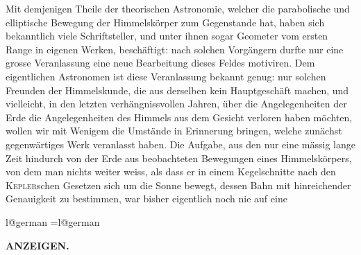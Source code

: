 Mit demjenigen Theile der theorischen Astronomie, welcher die parabolische und elliptische Bewegung der Himmelskörper zum Gegenstande hat, haben sich bekanntlich viele Schriftsteller, und unter ihnen sogar Geometer vom ersten Range in eigenen Werken, beschäftigt: nach solchen Vorgängern durfte nur eine grosse Veranlassung eine neue Bearbeitung dieses Feldes motiviren. Dem eigentlichen Astronomen ist diese Veranlassung bekannt genug: nur solchen Freunden der Himmelskunde, die aus derselben kein Hauptgeschäft machen, und vielleicht, in den letzten verhängnissvollen Jahren, über die Angelegenheiten der Erde die Angelegenheiten des Himmels aus dem Gesicht verloren haben möchten, wollen wir mit Wenigem die Umstände in Erinnerung bringen, welche zunächst gegenwärtiges Werk veranlasst haben. Die Aufgabe, aus den nur eine mässig lange Zeit hindurch von der Erde aus beobachteten Bewegungen eines Himmelskörpers, von dem man nichts weiter weiss, als dass er in einem Kegelschnitte nach den \textsc{Kepler}schen Gesetzen sich um die Sonne bewegt, dessen Bahn mit hinreichender Genauigkeit zu bestimmen, war bisher eigentlich noch nie auf eine
\par\clearpage
\endgroup
\clearpage
\begingroup
\pagestyle{empty}
\ifcsname l@german\endcsname
  \language=\csname l@german\endcsname\relax
   
\fi
\thispagestyle{empty}
\noindent{}%
%
\parbox[t]{\dimexpr\linewidth-24mm\relax}{\centering\footnotesize\bfseries ANZEIGEN.\par}%
\makebox[12mm][r]{}\par\nobreak\medskip

